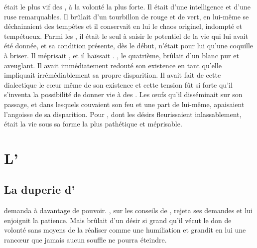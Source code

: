 \Ogo était le plus vif des \Dormus, à la volonté la plus forte. Il était d'une intelligence et d'une ruse remarquables. Il brûlait d'un tourbillon de rouge et de vert, en lui-même se déchainaient des tempêtes et il conservait en lui le chaos originel, indompté et tempétueux. Parmi les \Dormus, il était le seul à saisir le potentiel de la vie qui lui avait été donnée, et sa condition présente, dès le début, n'était pour lui qu'une coquille à briser. Il méprisait \Boromu, et il haïssait \Tot. \Tot, le quatrième, brûlait d'un blanc pur et aveuglant. Il avait immédiatement redouté son existence en tant qu'elle impliquait irrémédiablement sa propre disparition. Il avait fait de cette dialectique le cœur même de son existence et cette tension fût si forte qu'il s'inventa la possibilité de donner vie à des \SC. Les œufs qu'il disséminait sur son passage, et dans lesquels couvaient son feu et une part de lui-même, apaisaient l'angoisse de sa disparition. Pour \Ogo, dont les désirs fleurissaient inlassablement, \Tot
était la vie sous sa forme la plus pathétique et méprisable. 


\section{L'\Extinction}

\subsection{La duperie d'\Ogo}
 \Ogo demanda à \Mey davantage de pouvoir. \Mey, sur les conseils de \Cind, rejeta ses demandes et lui enjoignit la patience. Mais \Ogo brûlait d'un désir si grand qu'il vécut le don de volonté sans moyens de la réaliser comme une humiliation et grandit en lui une rancœur que jamais aucun souffle ne pourra éteindre.  
 
